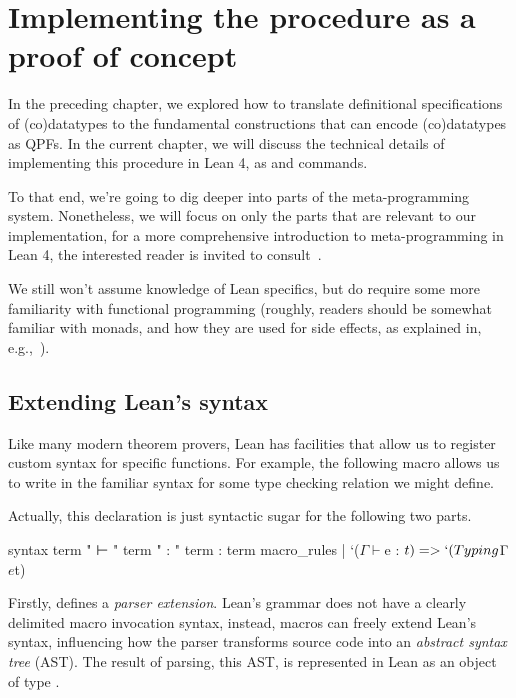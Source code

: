 \chapter{Implementing the procedure as a proof of concept}%
\label{ch:implementing}


In the preceding chapter, we explored how to translate definitional specifications of (co)datatypes to the fundamental constructions that can encode (co)datatypes as QPFs.
In the current chapter, we will discuss the technical details of implementing this procedure in Lean 4, as \data{}
and \codata{} commands.

To that end, we're going to dig deeper into parts of the meta-programming system. Nonetheless, we
will focus on only the parts that are relevant to our implementation, for a more comprehensive introduction
to meta-programming in Lean 4, the interested reader is invited to consult~\cite{paulinoMetaprogrammingLean, ullrichNotationsHygienicMacro2022}.


We still won't assume knowledge of Lean specifics, but do require some more familiarity with functional programming (roughly, readers should be somewhat familiar with monads, and how they are used for side effects, as explained in, e.g.,~\cite{christiansenFunctionalProgrammingLean}).


\section{Extending Lean's syntax}%
\label{sec:syntax}

Like many modern theorem provers, Lean has facilities that allow us to register custom syntax for specific functions. For example, the following macro allows us to write  in the familiar syntax for some type checking relation  we might define.
Actually, this  declaration is just syntactic sugar for the following two parts.

\begin{leancode}
  syntax term " ⊢ " term " : " term : term
  macro_rules
    | `($Γ ⊢ $e : $t) => `(Typing $Γ $e $t)
\end{leancode}

Firstly,  defines a \emph{parser extension}.
Lean's grammar does not have a clearly delimited macro invocation syntax, instead,
macros can freely extend Lean's syntax, influencing how the parser transforms source code into an \emph{abstract syntax tree} (AST).
The result of parsing, this AST, is represented in Lean as an object of type .

